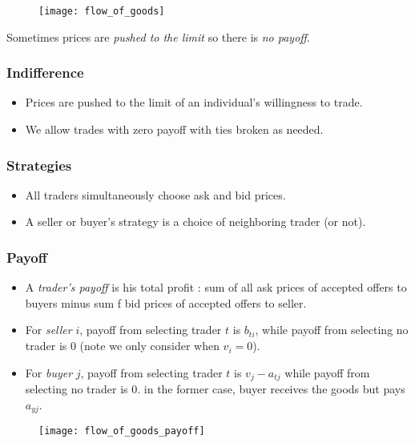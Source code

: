 \begin{figure}[H]
    \centering
    \texttt{[image: flow\_of\_goods]}
\end{figure}

Sometimes prices are \textit{pushed to the limit} so there is \textit{no payoff}.

\subsubsection{Indifference}

\begin{itemize}
\item Prices are pushed to the limit of an individual's willingness to trade.
\item We allow trades with zero payoff with ties broken as needed.
\end{itemize}

\subsubsection{Strategies}

\begin{itemize}
\item All traders simultaneously choose ask and bid prices.
\item A seller or buyer's strategy is a choice of neighboring trader (or not).
\end{itemize}

\subsubsection{Payoff}

\begin{itemize}
\item A \textit{trader's payoff} is his total profit : sum of all ask prices of accepted offers to buyers minus sum f bid prices of accepted offers to seller.
\item For \textit{seller} $i$, payoff from selecting trader $t$ is $b_{ti}$, while payoff from selecting no trader is $0$ (note we only consider when $v_i = 0$).
\item For \textit{buyer} $j$, payoff from selecting trader $t$ is $v_j - a_{tj}$ while payoff from selecting no trader is $0$. in the former case, buyer receives the goods but pays $a_{yj}$.
\end{itemize}

\begin{figure}[H]
    \centering
    \texttt{[image: flow\_of\_goods\_payoff]}
\end{figure}


